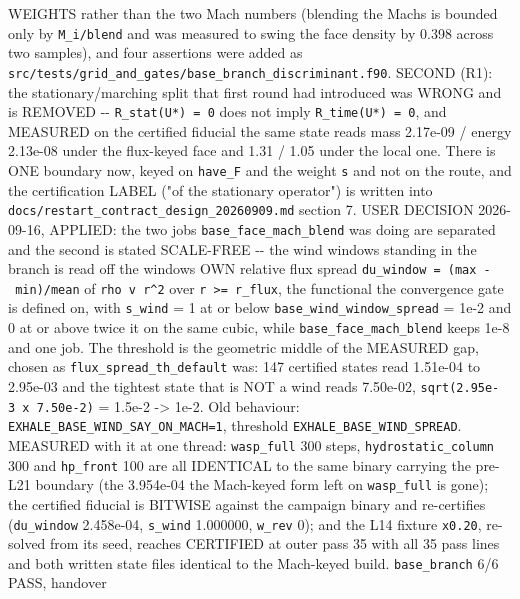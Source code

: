 \documentclass[english,a4paper]{my_memo}
\begin{document}
\begin{itemize}
  WEIGHTS rather than the two Mach numbers (blending the Machs is bounded only
  by \texttt{\textbar{}M\_i\textbar{}/blend} and was measured to swing the face density by 0.398 across
  two samples), and four assertions were added as
  \texttt{src/tests/grid\_and\_gates/base\_branch\_discriminant.f90}. SECOND (R1): the
  stationary/marching split that first round had introduced was WRONG and is
  REMOVED -\/- \texttt{R\_stat(U*)\ =\ 0} does not imply \texttt{R\_time(U*)\ =\ 0}, and MEASURED on
  the certified fiducial the same state reads mass 2.17e-09 / energy 2.13e-08
  under the flux-keyed face and 1.31 / 1.05 under the local one. There is ONE
  boundary now, keyed on \texttt{have\_F} and the weight \texttt{s} and not on the route, and
  the certification LABEL ("of the stationary operator") is written into
  \texttt{docs/restart\_contract\_design\_20260909.md} section 7. USER DECISION
  2026-09-16, APPLIED: the two jobs \texttt{base\_face\_mach\_blend} was doing are
  separated and the second is stated SCALE-FREE -\/- the wind window\textquotesingle s standing
  in the branch is read off the window\textquotesingle s OWN relative flux spread
  \texttt{du\_window\ =\ (max\ -\ min)/\textbar{}mean\textbar{}} of \texttt{rho\ v\ r\^{}2} over \texttt{r\ \textgreater{}=\ r\_flux}, the
  functional the convergence gate is defined on, with \texttt{s\_wind} = 1 at or below
  \texttt{base\_wind\_window\_spread} = 1e-2 and 0 at or above twice it on the same
  cubic, while \texttt{base\_face\_mach\_blend} keeps 1e-8 and one job. The threshold is
  the geometric middle of the MEASURED gap, chosen as \texttt{flux\_spread\_th\_default}
  was: 147 certified states read 1.51e-04 to 2.95e-03 and the tightest state
  that is NOT a wind reads 7.50e-02, \texttt{sqrt(2.95e-3\ x\ 7.50e-2)} = 1.5e-2 -\textgreater{}
  1e-2. Old behaviour: \texttt{EXHALE\_BASE\_WIND\_SAY\_ON\_MACH=1}, threshold
  \texttt{EXHALE\_BASE\_WIND\_SPREAD}. MEASURED with it at one thread: \texttt{wasp\_full} 300
  steps, \texttt{hydrostatic\_column} 300 and \texttt{hp\_front} 100 are all IDENTICAL to the
  same binary carrying the pre-L21 boundary (the 3.954e-04 the Mach-keyed form
  left on \texttt{wasp\_full} is gone); the certified fiducial is BITWISE against the
  campaign binary and re-certifies (\texttt{du\_window} 2.458e-04, \texttt{s\_wind} 1.000000,
  \texttt{w\_rev} 0); and the L14 fixture \texttt{x0.20}, re-solved from its seed, reaches
  CERTIFIED at outer pass 35 with all 35 pass lines and both written state
  files identical to the Mach-keyed build. \texttt{base\_branch} 6/6 PASS, handover

\end{itemize}
\end{document}
